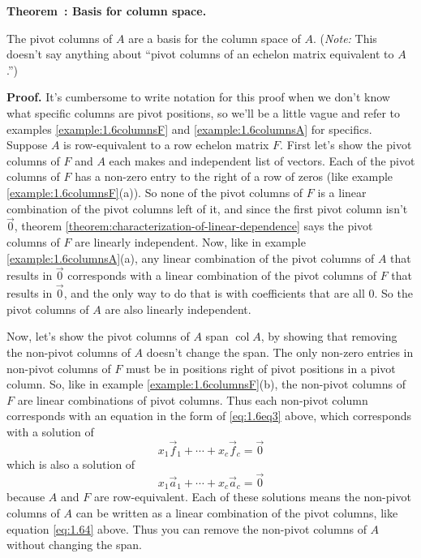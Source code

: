 \documentclass[11pt, letterpaper]{report}
\newenvironment{notes}{}{}
\newenvironment{book}{}{}
\newcounter{example}[section]
\newcounter{theorem}[chapter]
\newenvironment{theorem}[1][]{\refstepcounter{theorem}\begin{bbox}\par
    \noindent\textbf{Theorem~\thetheorem: #1}}{\end{bbox}}
\newlength\oldfboxsep%
\newlength\myminiwidth%
\newenvironment{bbox}{%
  \setlength\oldfboxsep\fboxsep
  \setlength{\fboxsep}{.1in}%
  \setlength\myminiwidth\linewidth%
  \addtolength\myminiwidth{-0.2in}%
  \vspace{0.1in}%
  \begin{lrbox}{\bboxbox}\begin{minipage}{\myminiwidth}%
    }{%
    \end{minipage}\end{lrbox}%
  \noindent\fbox{\usebox{\bboxbox}}\vspace{0.1in}\setlength\fboxsep\oldfboxsep%
}
\DeclareMathOperator{\col}{col}
\begin{document}
\begin{notes}
\vfill
\end{notes}

\begin{theorem}[Basis for column space.]
\label{theorem:basis-for-column-space}  

The pivot columns of $A$ are a basis for the column space of $A$. (\emph{Note:} This doesn't say anything about ``pivot columns of an echelon matrix equivalent to $A$.'')
\end{theorem}

\begin{book}
\textbf{Proof.} It's cumbersome to write notation for this proof when we don't know what specific columns are pivot positions, so we'll be a little vague and refer to examples \ref{example:1.6columnsF} and \ref{example:1.6columnsA} for specifics. Suppose $A$ is row-equivalent to a row echelon matrix $F$. 
First let's show the pivot columns of $F$ and $A$ each makes and independent list of vectors. Each of the pivot columns of $F$ has a non-zero entry to the right of a row of zeros (like example \ref{example:1.6columnsF}(a)). So none of the pivot columns of $F$ is a linear combination of the pivot columns left of it, and since the first pivot column isn't $\vec{0}$, theorem \ref{theorem:characterization-of-linear-dependence} says the pivot columns of $F$ are linearly independent. Now, like in example \ref{example:1.6columnsA}(a), any linear combination of the pivot columns of $A$ that results in $\vec{0}$ corresponds with a linear combination of the pivot columns of $F$ that results in $\vec{0}$, and the only way to do that is with coefficients that are all $0$. So the pivot columns of $A$ are also linearly independent.

Now, let's show the pivot columns of $A$ span $\col A$, by showing that removing the non-pivot columns of $A$ doesn't change the span. The only non-zero entries in non-pivot columns of $F$  must be in positions right of pivot positions in a pivot column. So, like in example \ref{example:1.6columnsF}(b), the non-pivot columns of $F$ are linear combinations of pivot columns. Thus each non-pivot column corresponds with an equation in the form of \ref{eq:1.6eq3} above, which corresponds with a solution of
\[x_1\vec{f}_1+\cdots+x_c\vec{f}_c = \vec{0}\]
which is also a solution of 
\[x_1\vec{a}_1+\cdots+x_c\vec{a}_c = \vec{0}\]
because $A$ and $F$ are row-equivalent. Each of these solutions means the non-pivot columns of $A$ can be written as a linear combination of the pivot columns, like equation \ref{eq:1.64} above. Thus you can remove the non-pivot columns of $A$ without changing the span. \hfill \blacksquare
\end{book}
\end{document}

